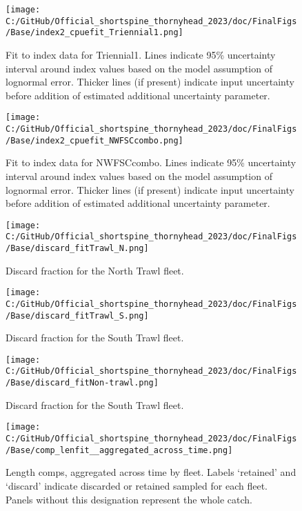 \documentclass[11pt,
  english,
  letterpaper,
]{article}
\begin{document}
\begin{figure}
\centering
\texttt{[image: C:/GitHub/Official\_shortspine\_thornyhead\_2023/doc/FinalFigs/Base/index2\_cpuefit\_Triennial1.png]}
\caption{Fit to index data for Triennial1. Lines indicate 95\% uncertainty interval around index values based on the model assumption of lognormal error. Thicker lines (if present) indicate input uncertainty before addition of estimated additional uncertainty parameter.\label{fig:fitsTri1}}
\end{figure}

\begin{figure}
\centering
\texttt{[image: C:/GitHub/Official\_shortspine\_thornyhead\_2023/doc/FinalFigs/Base/index2\_cpuefit\_NWFSCcombo.png]}
\caption{Fit to index data for NWFSCcombo. Lines indicate 95\% uncertainty interval around index values based on the model assumption of lognormal error. Thicker lines (if present) indicate input uncertainty before addition of estimated additional uncertainty parameter.\label{fig:fitscombo}}
\end{figure}

\begin{figure}
\centering
\texttt{[image: C:/GitHub/Official\_shortspine\_thornyhead\_2023/doc/FinalFigs/Base/discard\_fitTrawl\_N.png]}
\caption{Discard fraction for the North Trawl fleet.\label{fig:northtrl_disc}}
\end{figure}

\begin{figure}
\centering
\texttt{[image: C:/GitHub/Official\_shortspine\_thornyhead\_2023/doc/FinalFigs/Base/discard\_fitTrawl\_S.png]}
\caption{Discard fraction for the South Trawl fleet.\label{fig:southtrl_disc}}
\end{figure}

\begin{figure}
\centering
\texttt{[image: C:/GitHub/Official\_shortspine\_thornyhead\_2023/doc/FinalFigs/Base/discard\_fitNon-trawl.png]}
\caption{Discard fraction for the South Trawl fleet.\label{fig:nontrl_disc}}
\end{figure}

\begin{figure}
\centering
\texttt{[image: C:/GitHub/Official\_shortspine\_thornyhead\_2023/doc/FinalFigs/Base/comp\_lenfit\_\_aggregated\_across\_time.png]}
\caption{Length comps, aggregated across time by fleet. Labels `retained' and `discard' indicate discarded or retained sampled for each fleet. Panels without this designation represent the whole catch.\label{fig:lencomps_all}}
\end{figure}
\end{document}
